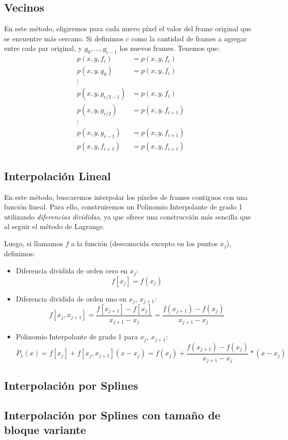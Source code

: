 \subsection{Vecinos}\label{Vecinos}
En este método, eligiremos para cada nuevo píxel el valor del frame original que se encuentre
más cercano.
Si definimos $c$ como la cantidad de frames a agregar entre cada par original, y
$g_0, \dots, g_{c-1}$ los nuevos frames. Tenemos que:
\begin{equation*}
    \begin{aligned}
        p(x,y,f_{i}) &= p(x,y,f_{i})\\
        p(x,y,g_{0}) &= p(x,y,f_{i})\\
        \vdots\\
        p(x,y,g_{c/2-1}) &= p(x,y,f_{i})\\
        p(x,y,g_{c/2}) &= p(x,y,f_{i+1})\\
        \vdots\\
        p(x,y,g_{c-1}) &= p(x,y,f_{i+1})\\
        p(x,y,f_{i+1}) &= p(x,y,f_{i+1})
    \end{aligned}
\end{equation*}

\subsection{Interpolación Lineal}\label{Lineal}
En este método, buscaremos interpolar los píxeles de frames contiguos con una función
lineal. Para ello, construiremos un Polinomio Interpolante de grado 1 utilizando
\textit{diferencias divididas}, ya que ofrece una construcción más sencilla que al seguir
el método de Lagrange.

Luego, si llamamos $f$ a la función (desconocida excepto en los puntos $x_j$), definimos:
\begin{itemize}
    \item Diferencia dividida de orden cero en $x_j$:
        \begin{equation*}
            f[x_j] = f(x_j)
        \end{equation*}
    \item Diferencia dividida de orden uno en $x_j$, $x_{j+1}$:
        \begin{equation*}
            f[x_j,x_{j+1}]= \frac{f[x_{j+1}] - f[x_j]}{x_{j+1} - x_j} = \frac{f(x_{j+1}) - f(x_j)}{x_{j+1} - x_j}
        \end{equation*}
    \item Polinomio Interpolante de grado 1 para $x_j$, $x_{j+1}$:
        \begin{equation*}
            P_1(x) = f[x_j] + f[x_j,x_{j+1}](x-x_j) = f(x_j) + \frac{f(x_{j+1}) - f(x_j)}{x_{j+1} - x_j}*(x-x_j)
        \end{equation*}
\end{itemize}

\subsection{Interpolación por Splines}\label{Splines}

\subsection{Interpolación por Splines con tamaño de bloque variante}\label{MultiSplines}

